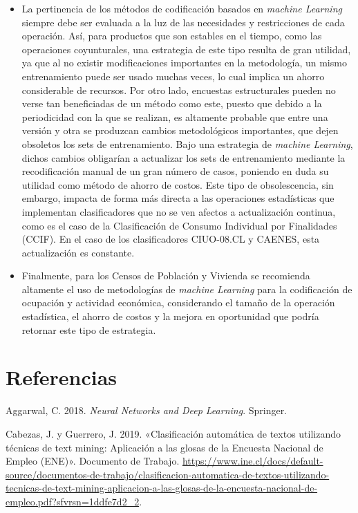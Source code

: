\documentclass[
  12pt,
  spanish,
]{article}
\begin{document}
\begin{itemize}
  \item La pertinencia de los métodos de codificación basados en \textit{machine Learning} siempre debe ser evaluada a la luz de las necesidades y restricciones de cada operación. Así, para productos que son estables en el tiempo, como las operaciones coyunturales, una estrategia de este tipo resulta de gran utilidad, ya que al no existir modificaciones importantes en la metodología, un mismo entrenamiento puede ser usado muchas veces, lo cual implica un ahorro considerable de recursos. Por otro lado, encuestas estructurales pueden no verse tan beneficiadas de un método como este, puesto que debido a la periodicidad con la que se realizan, es altamente probable que entre una versión y otra se produzcan cambios metodológicos importantes, que dejen obsoletos los sets de entrenamiento. Bajo una estrategia de \textit{machine Learning},  dichos cambios obligarían a actualizar los sets de entrenamiento mediante la recodificación manual de un gran número de casos, poniendo en duda su utilidad como método de ahorro de costos. Este tipo de obsolescencia, sin embargo, impacta de forma más directa a las operaciones estadísticas que implementan clasificadores que no se ven afectos a actualización continua, como es el caso de la Clasificación de Consumo Individual por Finalidades (CCIF). En el caso de los clasificadores CIUO-08.CL y CAENES, esta actualización es constante.

 \item Finalmente, para los Censos de Población y Vivienda se recomienda altamente el uso de metodologías de \textit{machine Learning} para la codificación de ocupación y actividad económica, considerando el tamaño de la operación estadística, el ahorro de costos y la mejora en oportunidad que podría retornar este tipo de estrategia.

\end{itemize}

\newpage

\hypertarget{referencias}{%
\section*{Referencias}\label{referencias}}

\hypertarget{refs}{}
\leavevmode\hypertarget{ref-aggarwal}{}%
Aggarwal, C. 2018. \emph{Neural Networks and Deep Learning}. Springer.

\leavevmode\hypertarget{ref-guerrero_cabezas}{}%
Cabezas, J. y Guerrero, J. 2019. «Clasificación automática de textos
utilizando técnicas de text mining: Aplicación a las glosas de la
Encuesta Nacional de Empleo (ENE)». Documento de Trabajo.
\url{https://www.ine.cl/docs/default-source/documentos-de-trabajo/clasificacion-automatica-de-textos-utilizando-tecnicas-de-text-mining-aplicacion-a-las-glosas-de-la-encuesta-nacional-de-empleo.pdf?sfvrsn=1ddfe7d2_2}.
\end{document}
